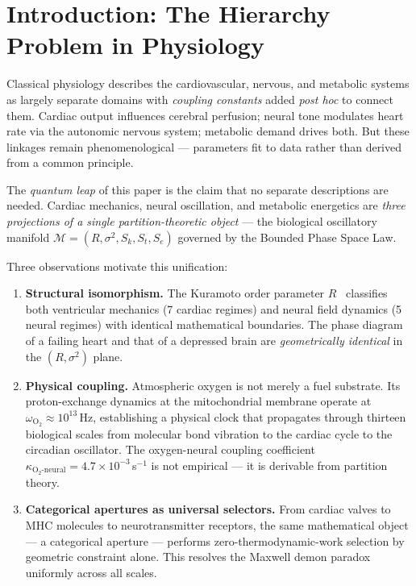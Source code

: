 \documentclass[10pt,twocolumn,a4paper]{article}
\theoremstyle{definition}
\newcommand{\calM}{\mathcal{M}}
\begin{document}
\section{Introduction: The Hierarchy Problem in Physiology}

Classical physiology describes the cardiovascular, nervous, and metabolic systems
as largely separate domains with \emph{coupling constants} added \emph{post hoc}
to connect them. Cardiac output influences cerebral perfusion; neural tone modulates
heart rate via the autonomic nervous system; metabolic demand drives both. But these
linkages remain phenomenological — parameters fit to data rather than derived from
a common principle.

The \emph{quantum leap} of this paper is the claim that no separate descriptions
are needed. Cardiac mechanics, neural oscillation, and metabolic energetics are
\emph{three projections of a single partition-theoretic object} — the biological
oscillatory manifold $\calM = (R, \sigma^2, S_k, S_t, S_e)$ governed by the
Bounded Phase Space Law.

Three observations motivate this unification:

\begin{enumerate}
\item \textbf{Structural isomorphism.} The Kuramoto order parameter $R$~\cite{strogatz2000kuramoto,acebron2005kuramoto} classifies
both ventricular mechanics (7 cardiac regimes) and neural field dynamics (5 neural
regimes) with identical mathematical boundaries. The phase diagram of a failing
heart and that of a depressed brain are \emph{geometrically identical} in the
$(R, \sigma^2)$ plane.

\item \textbf{Physical coupling.} Atmospheric oxygen is not merely a fuel substrate.
Its proton-exchange dynamics at the mitochondrial membrane operate at
$\omega_{\text{O}_2} \approx 10^{13}$\,Hz, establishing a physical clock that
propagates through thirteen biological scales from molecular bond vibration to
the cardiac cycle to the circadian oscillator. The oxygen-neural coupling
coefficient $\kappa_{\text{O}_2\text{-neural}} = 4.7 \times 10^{-3}$\,s$^{-1}$
is not empirical — it is derivable from partition theory.

\item \textbf{Categorical apertures as universal selectors.} From cardiac valves to
MHC molecules to neurotransmitter receptors, the same mathematical object —
a categorical aperture --- performs zero-thermodynamic-work selection by geometric
constraint alone. This resolves the Maxwell demon paradox~\cite{landauer1961irreversibility,bennett1982thermodynamics} uniformly across all scales.
\end{enumerate}
\end{document}
